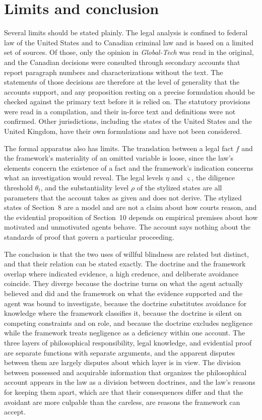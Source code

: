 \documentclass[11pt]{article}
\theoremstyle{plain}
\theoremstyle{definition}
\begin{document}
\section{Limits and conclusion}

Several limits should be stated plainly. The legal analysis is confined to federal law of the United States and to Canadian criminal law and is based on a limited set of sources. Of those, only the opinion in \emph{Global-Tech} was read in the original, and the Canadian decisions were consulted through secondary accounts that report paragraph numbers and characterizations without the text. The statements of those decisions are therefore at the level of generality that the accounts support, and any proposition resting on a precise formulation should be checked against the primary text before it is relied on. The statutory provisions were read in a compilation, and their in-force text and definitions were not confirmed. Other jurisdictions, including the states of the United States and the United Kingdom, have their own formulations and have not been considered.

The formal apparatus also has limits. The translation between a legal fact $f$ and the framework's materiality of an omitted variable is loose, since the law's elements concern the existence of a fact and the framework's indication concerns what an investigation would reveal. The legal levels $\eta$ and $\varsigma$, the diligence threshold $\theta_t$, and the substantiality level $\rho$ of the stylized states are all parameters that the account takes as given and does not derive. The stylized states of Section~8 are a model and are not a claim about how courts reason, and the evidential proposition of Section~10 depends on empirical premises about how motivated and unmotivated agents behave. The account says nothing about the standards of proof that govern a particular proceeding.

The conclusion is that the two uses of willful blindness are related but distinct, and that their relation can be stated exactly. The doctrine and the framework overlap where indicated evidence, a high credence, and deliberate avoidance coincide. They diverge because the doctrine turns on what the agent actually believed and did and the framework on what the evidence supported and the agent was bound to investigate, because the doctrine substitutes avoidance for knowledge where the framework classifies it, because the doctrine is silent on competing constraints and on role, and because the doctrine excludes negligence while the framework treats negligence as a deficiency within one account. The three layers of philosophical responsibility, legal knowledge, and evidential proof are separate functions with separate arguments, and the apparent disputes between them are largely disputes about which layer is in view. The division between possessed and acquirable information that organizes the philosophical account appears in the law as a division between doctrines, and the law's reasons for keeping them apart, which are that their consequences differ and that the avoidant are more culpable than the careless, are reasons the framework can accept.
\end{document}
